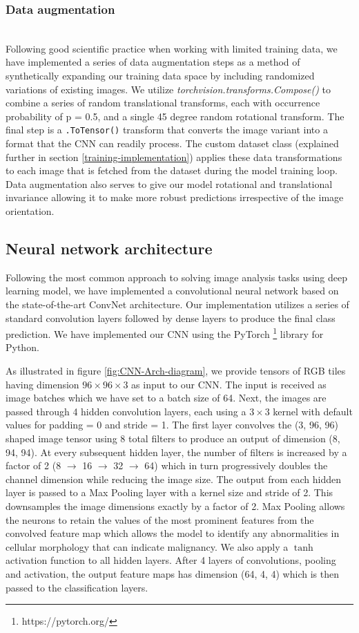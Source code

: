 \documentclass{l4proj}
\begin{document}
\subsubsection{Data augmentation}\hfill\\
Following good scientific practice when working with limited training data, we have implemented a series of data augmentation steps as a method of synthetically expanding our training data space by including randomized variations of existing images. We utilize \textit{torchvision.transforms.Compose()} to combine a series of random translational transforms, each with occurrence probability of p = 0.5, and a single 45 degree random rotational transform. The final step is a \texttt{.ToTensor()} transform that converts the image variant into a format that the CNN can readily process. The custom dataset class (explained further in section \ref{training-implementation}) applies these data transformations to each image that is fetched from the dataset during the model training loop. Data augmentation also serves to give our model rotational and translational invariance allowing it to make more robust predictions irrespective of the image orientation. 

\subsection{Neural network architecture} \label{cnn-architecture}
Following the most common approach to solving image analysis tasks using deep learning model, we have implemented a convolutional neural network based on the state-of-the-art ConvNet architecture. Our implementation utilizes a series of standard convolution layers followed by dense layers to produce the final class prediction. We have implemented our CNN using the PyTorch \footnote{https://pytorch.org/} library for Python. 

As illustrated in figure \ref{fig:CNN-Arch-diagram}, we provide tensors of RGB tiles having dimension \(96 \times 96 \times 3\) as input to our CNN. The input is received as image batches which we have set to a batch size of 64. Next, the images are passed through 4 hidden convolution layers, each using a \(3 \times 3\) kernel with default values for padding = 0 and stride = 1. The first layer convolves the (3, 96, 96) shaped image tensor using 8 total filters to produce an output of dimension (8, 94, 94). At every subsequent hidden layer, the number of filters is increased by a factor of 2 (8 \(\rightarrow\) 16 \(\rightarrow\) 32 \(\rightarrow\) 64) which in turn progressively doubles the channel dimension while reducing the image size. The output from each hidden layer is passed to a Max Pooling layer with a kernel size and stride of 2. This downsamples the image dimensions exactly by a factor of 2. Max Pooling allows the neurons to retain the values of the most prominent features from the convolved feature map which allows the model to identify any abnormalities in cellular morphology that can indicate malignancy. We also apply a \(\tanh\) activation function to all hidden layers. After 4 layers of convolutions, pooling and activation, the output feature maps has dimension (64, 4, 4) which is then passed to the classification layers. 
\\
\end{document}
